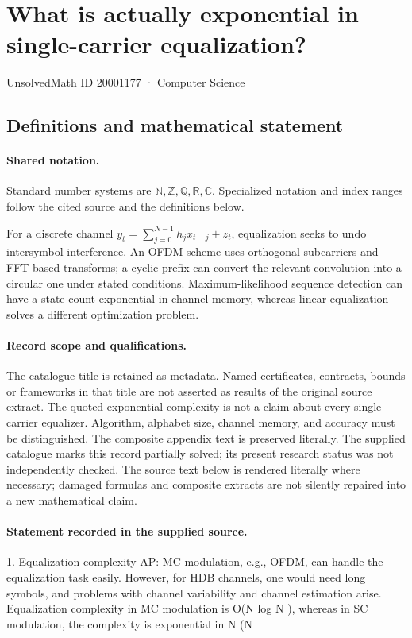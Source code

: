 \documentclass[11pt]{article}
\begin{document}
\setcounter{section}{20001176}
\section{What is actually exponential in single-carrier equalization?}\label{20001177}
{\small\sffamily UnsolvedMath ID 20001177 · Computer Science}
\subsection{Definitions and mathematical statement}

\paragraph{Shared notation.}Standard number systems are $\mathbb N,\mathbb Z,\mathbb Q,\mathbb R,\mathbb C$. Specialized notation and index ranges follow the cited source and the definitions below.


For a discrete channel $y_t=\sum_{j=0}^{N-1}h_jx_{t-j}+z_t$, equalization seeks to undo intersymbol interference. An OFDM scheme uses orthogonal subcarriers and FFT-based transforms; a cyclic prefix can convert the relevant convolution into a circular one under stated conditions. Maximum-likelihood sequence detection can have a state count exponential in channel memory, whereas linear equalization solves a different optimization problem.
\paragraph{Record scope and qualifications.}
The catalogue title is retained as metadata. Named certificates, contracts, bounds or frameworks in that title are not asserted as results of the original source extract.
The quoted exponential complexity is not a claim about every single-carrier equalizer. Algorithm, alphabet size, channel memory, and accuracy must be distinguished. The composite appendix text is preserved literally. The supplied catalogue marks this record partially solved; its present research status was not independently checked.
The source text below is rendered literally where necessary; damaged formulas and composite extracts are not silently repaired into a new mathematical claim.
\paragraph{Statement recorded in the supplied source.}
1. Equalization complexity AP: MC modulation, e.g., OFDM, can handle the equalization task easily. However, for HDB channels, one would need long symbols, and problems with channel variability and channel estimation arise. Equalization complexity in MC modulation is O(N log N ), whereas in SC modulation, the complexity is exponential in N (N
\end{document}
